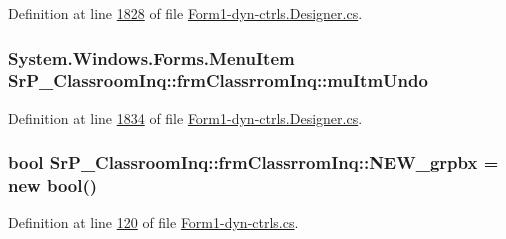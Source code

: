 \-Definition at line \hyperlink{_form1-dyn-ctrls_8_designer_8cs_source_l01828}{1828} of file \hyperlink{_form1-dyn-ctrls_8_designer_8cs_source}{\-Form1-\/dyn-\/ctrls.\-Designer.\-cs}.

\hypertarget{class_sr_p___classroom_inq_1_1frm_classrrom_inq_aa3e4ca1c9b69ec8008d53de0a7727b9f}{
\subsubsection[{mu\-Itm\-Undo}]{\setlength{\rightskip}{0pt plus 5cm}\-System.\-Windows.\-Forms.\-Menu\-Item {\bf \-Sr\-P\-\_\-\-Classroom\-Inq\-::frm\-Classrrom\-Inq\-::mu\-Itm\-Undo}}}
\label{class_sr_p___classroom_inq_1_1frm_classrrom_inq_aa3e4ca1c9b69ec8008d53de0a7727b9f}


\-Definition at line \hyperlink{_form1-dyn-ctrls_8_designer_8cs_source_l01834}{1834} of file \hyperlink{_form1-dyn-ctrls_8_designer_8cs_source}{\-Form1-\/dyn-\/ctrls.\-Designer.\-cs}.

\hypertarget{class_sr_p___classroom_inq_1_1frm_classrrom_inq_aaf5a152b29ae06c11e8e25f0eabf454d}{
\subsubsection[{\-N\-E\-W\-\_\-grpbx}]{\setlength{\rightskip}{0pt plus 5cm}bool {\bf \-Sr\-P\-\_\-\-Classroom\-Inq\-::frm\-Classrrom\-Inq\-::\-N\-E\-W\-\_\-grpbx} = new bool()}}
\label{class_sr_p___classroom_inq_1_1frm_classrrom_inq_aaf5a152b29ae06c11e8e25f0eabf454d}


\-Definition at line \hyperlink{_form1-dyn-ctrls_8cs_source_l00120}{120} of file \hyperlink{_form1-dyn-ctrls_8cs_source}{\-Form1-\/dyn-\/ctrls.\-cs}.

